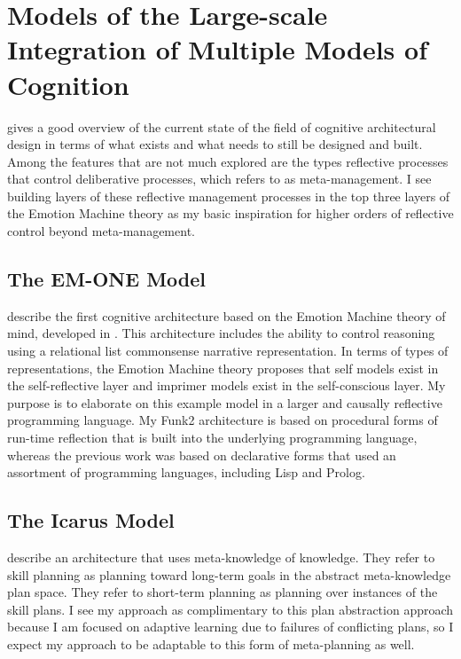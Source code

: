 \section{Models of the Large-scale Integration of Multiple Models of Cognition}

\cite{langley:2008} gives a good overview of the current state of the field of cognitive architectural design in terms of what exists and what needs to still be designed and built.
Among the features that are not much explored are the types reflective processes that control deliberative processes, which \cite{sloman:2001} refers to as meta-management.
I see building layers of these reflective management processes in the top three layers of the Emotion Machine theory as my basic inspiration for higher orders of reflective control beyond meta-management.

\subsection{The EM-ONE Model}

\cite{singh:2005} describe the first cognitive architecture based on the Emotion Machine theory of mind, developed in \cite{minsky:2006}.
This architecture includes the ability to control reasoning using a relational list commonsense narrative representation.
In terms of types of representations, the Emotion Machine theory proposes that self models exist in the self-reflective layer and imprimer models exist in the self-conscious layer.
My purpose is to elaborate on this example model in a larger and causally reflective programming language.
My Funk2 architecture is based on procedural forms of run-time reflection that is built into the underlying programming language, whereas the previous work was based on declarative forms that used an assortment of programming languages, including Lisp and Prolog.

\subsection{The Icarus Model}

\cite{langley:2005} describe an architecture that uses meta-knowledge of knowledge.
They refer to skill planning as planning toward long-term goals in the abstract meta-knowledge plan space.
They refer to short-term planning as planning over instances of the skill plans.
I see my approach as complimentary to this plan abstraction approach because I am focused on adaptive learning due to failures of conflicting plans, so I expect my approach to be adaptable to this form of meta-planning as well.

